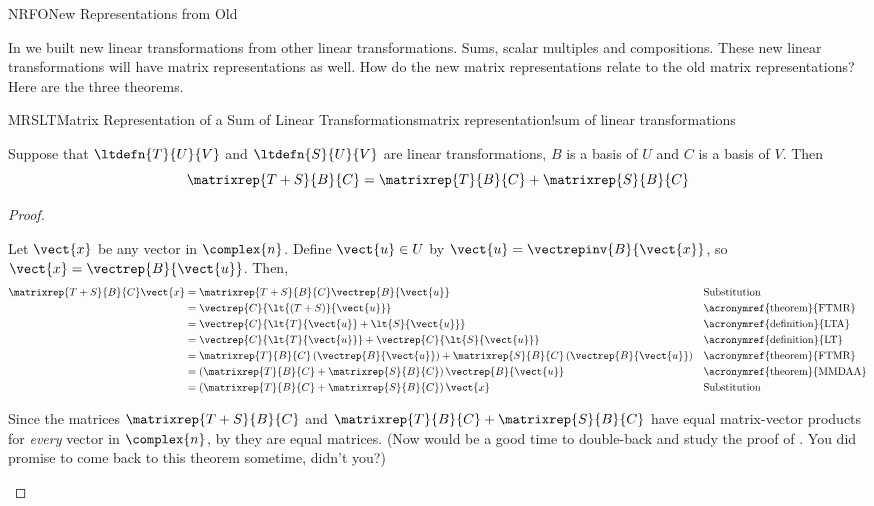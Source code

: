 %
\begin{subsect}{NRFO}{New Representations from Old}
%
\begin{para}In  we built new linear transformations from other linear transformations.  Sums, scalar multiples and compositions.  These new linear transformations will have matrix representations as well.  How do the new matrix representations relate to the old matrix representations?  Here are the three theorems.\end{para}
%
\begin{theorem}{MRSLT}{Matrix Representation of a Sum of Linear Transformations}{matrix representation!sum of linear transformations}
\begin{para}Suppose that $\ltdefn{T}{U}{V}$ and $\ltdefn{S}{U}{V}$ are linear transformations, $B$ is a basis of $U$ and $C$ is a basis of $V$.  Then
%
\begin{equation*}
\matrixrep{T+S}{B}{C}=\matrixrep{T}{B}{C}+\matrixrep{S}{B}{C}
\end{equation*}
\end{para}
%
\end{theorem}
%
\begin{proof}
\begin{para}Let $\vect{x}$ be any vector in $\complex{n}$.  Define $\vect{u}\in U$ by $\vect{u}=\vectrepinv{B}{\vect{x}}$, so $\vect{x}=\vectrep{B}{\vect{u}}$.  Then,
%
\begin{align*}
\matrixrep{T+S}{B}{C}\vect{x}&=
\matrixrep{T+S}{B}{C}\vectrep{B}{\vect{u}}&&\text{Substitution}\\
&=\vectrep{C}{\lt{\left(T+S\right)}{\vect{u}}}&&\text{\acronymref{theorem}{FTMR}}\\
&=\vectrep{C}{\lt{T}{\vect{u}}+\lt{S}{\vect{u}}}&&\text{\acronymref{definition}{LTA}}\\
&=\vectrep{C}{\lt{T}{\vect{u}}}+\vectrep{C}{\lt{S}{\vect{u}}}&&\text{\acronymref{definition}{LT}}\\
&=\matrixrep{T}{B}{C}\left(\vectrep{B}{\vect{u}}\right)+\matrixrep{S}{B}{C}\left(\vectrep{B}{\vect{u}}\right)&&\text{\acronymref{theorem}{FTMR}}\\
&=\left(\matrixrep{T}{B}{C}+\matrixrep{S}{B}{C}\right)\vectrep{B}{\vect{u}}&&\text{\acronymref{theorem}{MMDAA}}\\
&=\left(\matrixrep{T}{B}{C}+\matrixrep{S}{B}{C}\right)\vect{x}&&\text{Substitution}
\end{align*}
\end{para}
%
\begin{para}Since the matrices $\matrixrep{T+S}{B}{C}$ and $\matrixrep{T}{B}{C}+\matrixrep{S}{B}{C}$ have equal matrix-vector products for {\em every} vector in $\complex{n}$, by  they are equal matrices.  (Now would be a good time to double-back and study the proof of .  You did promise to come back to this theorem sometime, didn't you?)\end{para}

\end{proof}
\end{subsect}
